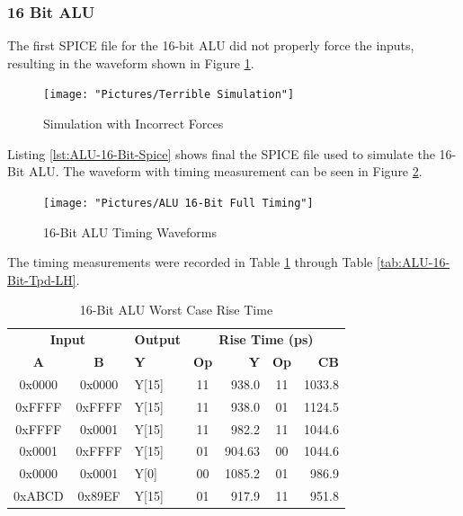 \documentclass[11pt]{article}
\begin{document}
		\subsubsection{16 Bit ALU}
		
			The first SPICE file for the 16-bit ALU did not properly force the inputs, resulting in the waveform shown in Figure \ref{fig:terrible-simulation}.
		
			\begin{figure}[H]
				\centering
				\texttt{[image: "Pictures/Terrible Simulation"]}
				\caption{Simulation with Incorrect Forces}
				\label{fig:terrible-simulation}
			\end{figure}
			
			Listing \ref{lst:ALU-16-Bit-Spice} shows final the SPICE file used to simulate the 16-Bit ALU.  The waveform with timing measurement can be seen in Figure \ref{fig:alu-16-bit-full-timing}.
		
			\begin{figure}[H]
				\centering
				\texttt{[image: "Pictures/ALU 16-Bit Full Timing"]}
				\caption{16-Bit ALU Timing Waveforms}
				\label{fig:alu-16-bit-full-timing}
			\end{figure}
			
			The timing measurements were recorded in Table \ref{tab:ALU-16-Bit-Risetime} through Table \ref{tab:ALU-16-Bit-Tpd-LH}.
		
			\begin{table}[H]
				\centering
				\caption{16-Bit ALU Worst Case Rise Time}
				\label{tab:ALU-16-Bit-Risetime}
				\begin{tabular}{|cclcrcr|}
					\hline
					\multicolumn{2}{|c}{\textbf{Input}} & \textbf{Output} & \multicolumn{4}{c|}{\textbf{Rise Time (ps)}} \\
					\textbf{A} & \textbf{B} & \textbf{Y} & \textbf{Op} & \textbf{Y} & \textbf{Op} & \textbf{CB} \\
					\hline
					0x0000 & 0x0000 & Y{[}15{]} & 11 & 938.0 & 11 & 1033.8 \\
					0xFFFF & 0xFFFF & Y{[}15{]} & 11 & 938.0 & 01 & 1124.5 \\
					0xFFFF & 0x0001 & Y{[}15{]} & 11 & 982.2 & 11 & 1044.6 \\
					0x0001 & 0xFFFF & Y{[}15{]} & 01 & 904.63 & 00 & 1044.6 \\
					0x0000 & 0x0001 & Y{[}0{]} & 00 & 1085.2 & 01 & 986.9 \\
					0xABCD & 0x89EF & Y{[}15{]} & 01 & 917.9 & 11 & 951.8 \\
					\hline
				\end{tabular}
			\end{table}
		
\end{document}

